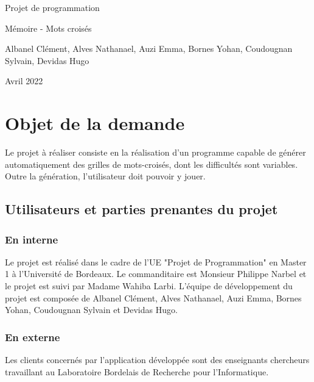 \documentclass [ 11 pt ] {article}
\begin{document}
\begin{titlepage}
   \begin{center}
        \vspace*{10cm}
        \Huge{Projet de programmation}
        \vspace{0.5cm}
       
        \LARGE{Mémoire - Mots croisés}
            
        \vspace{0.5cm}
        \large{Albanel Clément, Alves Nathanael, Auzi Emma, Bornes Yohan, Coudougnan Sylvain, Devidas Hugo}

        \vspace{3 cm}
        \Large{Avril 2022}
       
       \vfill
    \end{center}
\end{titlepage}
\newpage
\tableofcontents
\newpage
\listoffigures
\newpage

\section{Objet de la demande} %

    \hspace{1cm} Le projet à réaliser consiste en la réalisation d'un programme capable de générer automatiquement des grilles de mots-croisés, dont les difficultés sont variables. Outre la génération, l'utilisateur doit pouvoir y jouer. 


    \subsection{Utilisateurs et parties prenantes du projet}
        \subsubsection{En interne}
        
        \hspace{1cm} Le projet est réalisé dans le cadre de l'UE "Projet de Programmation" en Master 1 à l'Université de Bordeaux. Le commanditaire est Monsieur Philippe Narbel et le projet est suivi par Madame Wahiba Larbi. L'équipe de développement du projet est composée de Albanel Clément, Alves Nathanael, Auzi Emma, Bornes Yohan, Coudougnan Sylvain et Devidas Hugo.
        
        \subsubsection{En externe}
        \hspace{1cm} Les clients concernés par l'application développée sont des enseignants chercheurs travaillant au Laboratoire Bordelais de Recherche pour l'Informatique. 
        
\end{document}
